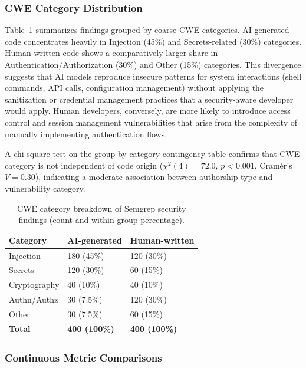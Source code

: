 \subsubsection{CWE Category Distribution}

Table~\ref{tab:cwe_dist} summarizes findings grouped by coarse CWE categories. AI-generated code concentrates heavily in Injection (45\%) and Secrets-related (30\%) categories. Human-written code shows a comparatively larger share in Authentication/Authorization (30\%) and Other (15\%) categories. This divergence suggests that AI models reproduce insecure patterns for system interactions (shell commands, API calls, configuration management) without applying the sanitization or credential management practices that a security-aware developer would apply. Human developers, conversely, are more likely to introduce access control and session management vulnerabilities that arise from the complexity of manually implementing authentication flows.

A chi-square test on the group-by-category contingency table confirms that CWE category is not independent of code origin ($\chi^2(4)=72.0$, $p<0.001$, Cramér's $V=0.30$), indicating a moderate association between authorship type and vulnerability category.

\begin{table}[H]
\caption{CWE category breakdown of Semgrep security findings (count and within-group percentage).}
\label{tab:cwe_dist}
\centering
\small
\begin{tabularx}{\columnwidth}{@{}lXX@{}}
\toprule
\textbf{Category} & \textbf{AI-generated} & \textbf{Human-written} \\
\midrule
Injection    & 180 (45\%)   & 120 (30\%) \\
Secrets      & 120 (30\%)   &  60 (15\%) \\
Cryptography &  40 (10\%)   &  40 (10\%) \\
Authn/Authz  &  30 (7.5\%)  & 120 (30\%) \\
Other        &  30 (7.5\%)  &  60 (15\%) \\
\midrule
\textbf{Total} & \textbf{400 (100\%)} & \textbf{400 (100\%)} \\
\bottomrule
\end{tabularx}
\end{table}

\subsubsection{Continuous Metric Comparisons}

